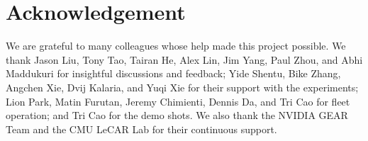 \section{Acknowledgement}
We are grateful to many colleagues whose help made this project possible. We thank Jason Liu, Tony Tao, Tairan He, Alex Lin, Jim Yang, Paul Zhou, and Abhi Maddukuri for insightful discussions and feedback; Yide Shentu, Bike Zhang, Angchen Xie, Dvij Kalaria, and Yuqi Xie for their support with the experiments; Lion Park, Matin Furutan, Jeremy Chimienti, Dennis Da, and Tri Cao for fleet operation; and Tri Cao for the demo shots. We also thank the NVIDIA GEAR Team and the CMU LeCAR Lab for their continuous support.